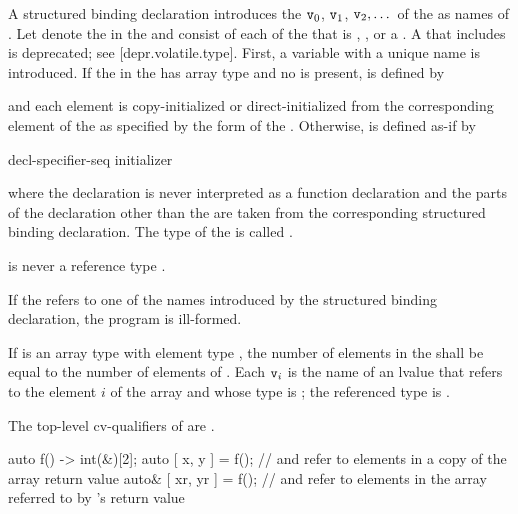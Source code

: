 \documentclass{wg21}
\begin{document}
\pnum
A structured binding declaration introduces the 
$\texttt{v}_0$, $\texttt{v}_1$, $\texttt{v}_2, \dotsc$
of the
 as names
of .
Let \cv{} denote the  in
the  and
 consist of 
{each  of the  that
is , , or a
}.
A \cv{} that includes  is deprecated;
see [depr.volatile.type].
First, a variable with a unique name  is introduced. If the
 in the 
has array type   and no  is present,
 is defined by
\begin{ncbnf}
      \cv{}   \terminal{;}
\end{ncbnf}
and each element is copy-initialized or direct-initialized
from the corresponding element of the  as specified
by the form of the .
Otherwise, 
is defined as-if by
\begin{ncbnf}
     decl-specifier-seq   initializer \terminal{;}
\end{ncbnf}
where
the declaration is never interpreted as a function declaration and
the parts of the declaration other than the  are taken
from the corresponding structured binding declaration.
The type of the 
 is called .
\begin{note}
     is never a reference type .
\end{note}

\pnum
If the  refers to
one of the names introduced by the structured binding declaration,
the program is ill-formed.

\pnum
If  is an array type with element type , the number
of elements in the  shall be equal to the
number of elements of . Each $\texttt{v}_i$ is the name of an
lvalue that refers to the element $i$ of the array and whose type
is ; the referenced type is .
\begin{note}
    The top-level cv-qualifiers of  are \cv.
\end{note}
\begin{example}
    \begin{codeblock}
        auto f() -> int(&)[2];
        auto [ x, y ] = f();            //  and  refer to elements in a copy of the array return value
        auto& [ xr, yr ] = f();         //  and  refer to elements in the array referred to by 's return value
    \end{codeblock}
\end{example}
\end{document}
